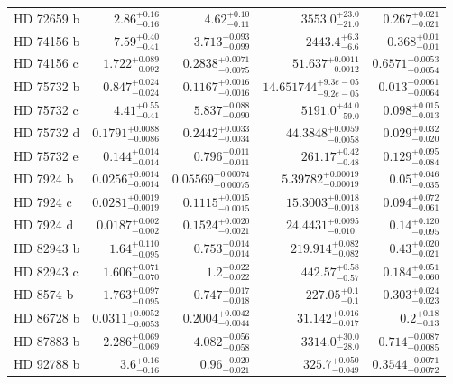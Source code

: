\begin{longtable*}{lrrrr}
HD 72659 b & $2.86^{+0.16}_{-0.16}$ & $4.62^{+0.10}_{-0.11}$ & $3553.0^{+23.0}_{-21.0}$ & $0.267^{+0.021}_{-0.021}$ \\ 
HD 74156 b & $7.59^{+0.40}_{-0.41}$ & $3.713^{+0.093}_{-0.099}$ & $2443.4^{+6.3}_{-6.6}$ & $0.368^{+0.01}_{-0.01}$ \\ 
HD 74156 c & $1.722^{+0.089}_{-0.092}$ & $0.2838^{+0.0071}_{-0.0075}$ & $51.637^{+0.0011}_{-0.0012}$ & $0.6571^{+0.0053}_{-0.0054}$ \\ 
HD 75732 b & $0.847^{+0.024}_{-0.024}$ & $0.1167^{+0.0016}_{-0.0016}$ & $14.651744^{+9.3e-05}_{-9.2e-05}$ & $0.013^{+0.0061}_{-0.0064}$ \\ 
HD 75732 c & $4.41^{+0.55}_{-0.41}$ & $5.837^{+0.088}_{-0.090}$ & $5191.0^{+44.0}_{-59.0}$ & $0.098^{+0.015}_{-0.013}$ \\ 
HD 75732 d & $0.1791^{+0.0088}_{-0.0086}$ & $0.2442^{+0.0033}_{-0.0034}$ & $44.3848^{+0.0059}_{-0.0058}$ & $0.029^{+0.032}_{-0.020}$ \\ 
HD 75732 e & $0.144^{+0.014}_{-0.014}$ & $0.796^{+0.011}_{-0.011}$ & $261.17^{+0.42}_{-0.48}$ & $0.129^{+0.095}_{-0.084}$ \\ 
HD 7924 b & $0.0256^{+0.0014}_{-0.0014}$ & $0.05569^{+0.00074}_{-0.00075}$ & $5.39782^{+0.00019}_{-0.00019}$ & $0.05^{+0.046}_{-0.035}$ \\ 
HD 7924 c & $0.0281^{+0.0019}_{-0.0019}$ & $0.1115^{+0.0015}_{-0.0015}$ & $15.3003^{+0.0018}_{-0.0018}$ & $0.094^{+0.072}_{-0.061}$ \\ 
HD 7924 d & $0.0187^{+0.002}_{-0.002}$ & $0.1524^{+0.0020}_{-0.0021}$ & $24.4431^{+0.0095}_{-0.010}$ & $0.14^{+0.120}_{-0.095}$ \\ 
HD 82943 b & $1.64^{+0.110}_{-0.095}$ & $0.753^{+0.014}_{-0.014}$ & $219.914^{+0.082}_{-0.082}$ & $0.43^{+0.020}_{-0.021}$ \\ 
HD 82943 c & $1.606^{+0.071}_{-0.070}$ & $1.2^{+0.022}_{-0.022}$ & $442.57^{+0.58}_{-0.57}$ & $0.184^{+0.051}_{-0.060}$ \\ 
HD 8574 b & $1.763^{+0.097}_{-0.095}$ & $0.747^{+0.017}_{-0.018}$ & $227.05^{+0.1}_{-0.1}$ & $0.303^{+0.024}_{-0.023}$ \\ 
HD 86728 b & $0.0311^{+0.0052}_{-0.0053}$ & $0.2004^{+0.0042}_{-0.0044}$ & $31.142^{+0.016}_{-0.017}$ & $0.2^{+0.18}_{-0.13}$ \\ 
HD 87883 b & $2.286^{+0.069}_{-0.069}$ & $4.082^{+0.056}_{-0.058}$ & $3314.0^{+30.0}_{-28.0}$ & $0.714^{+0.0087}_{-0.0085}$ \\ 
HD 92788 b & $3.6^{+0.16}_{-0.16}$ & $0.96^{+0.020}_{-0.021}$ & $325.7^{+0.050}_{-0.049}$ & $0.3544^{+0.0071}_{-0.0072}$ \\ 

\end{longtable*}
